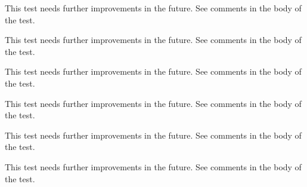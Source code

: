 \begin{DoxyRefList}
\item[Subprogram \mbox{\hyperlink{namespaceTest__System__mod_a733db17082cd5058dbc8d19e6f620909}{Test\+\_\+\+System\+\_\+mod\+::test\+\_\+execute\+Cmd\+\_\+2}} ()]\label{todo__todo000096}%
%
 This test needs further improvements in the future. See comments in the body of the test.  
\item[Subprogram \mbox{\hyperlink{namespaceTest__System__mod_a9a276bf5a7b9db66c140bd2202ebc7e9}{Test\+\_\+\+System\+\_\+mod\+::test\+\_\+get\+System\+Info\+\_\+1}} ()]\label{todo__todo000097}%
%
 This test needs further improvements in the future. See comments in the body of the test.  
\item[Subprogram \mbox{\hyperlink{namespaceTest__System__mod_aabfd080659733c4a852c62ccd400599b}{Test\+\_\+\+System\+\_\+mod\+::test\+\_\+\+OS\+\_\+type\+\_\+1}} ()]\label{todo__todo000091}%
%
 This test needs further improvements in the future. See comments in the body of the test.  
\item[Subprogram \mbox{\hyperlink{namespaceTest__System__mod_a86976d55b3a779d9a8c0064155e9cd4a}{Test\+\_\+\+System\+\_\+mod\+::test\+\_\+\+OS\+\_\+type\+\_\+2}} ()]\label{todo__todo000092}%
%
 This test needs further improvements in the future. See comments in the body of the test.  
\item[Subprogram \mbox{\hyperlink{namespaceTest__System__mod_ada729e6f3789a1df730ac21f58d5a334}{Test\+\_\+\+System\+\_\+mod\+::test\+\_\+\+OS\+\_\+type\+\_\+3}} ()]\label{todo__todo000093}%
%
 This test needs further improvements in the future. See comments in the body of the test.  
\item[Subprogram \mbox{\hyperlink{namespaceTest__System__mod_a6ba8a4348e2457b775dd061d40f33cb8}{Test\+\_\+\+System\+\_\+mod\+::test\+\_\+\+Sys\+Cmd\+\_\+type\+\_\+1}} ()]\label{todo__todo000094}%
%
 This test needs further improvements in the future. See comments in the body of the test. 
\end{DoxyRefList}